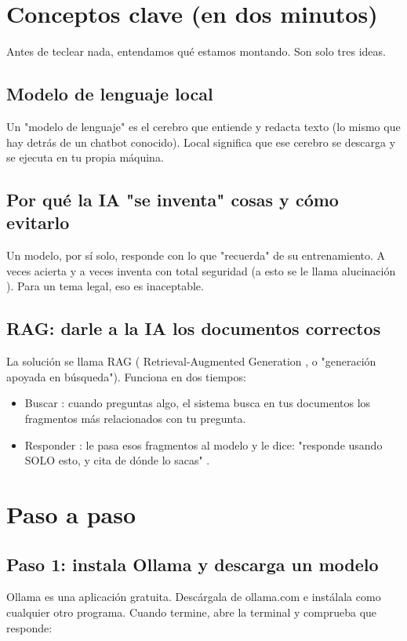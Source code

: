 \documentclass[11pt,a4paper]{book}
\begin{document}
\section{Conceptos clave (en dos minutos)}
Antes de teclear nada, entendamos qué estamos montando. Son solo tres ideas.

\subsection{Modelo de lenguaje local}
Un "modelo de lenguaje" es el cerebro que entiende y redacta texto (lo mismo que hay detrás de un chatbot conocido). Local significa que ese cerebro se descarga y se ejecuta en tu propia máquina.

\subsection{Por qué la IA "se inventa" cosas y cómo evitarlo}
Un modelo, por sí solo, responde con lo que "recuerda" de su entrenamiento. A veces acierta y a veces inventa con total seguridad (a esto se le llama alucinación ). Para un tema legal, eso es inaceptable.

\subsection{RAG: darle a la IA los documentos correctos}
La solución se llama RAG ( Retrieval-Augmented Generation , o "generación apoyada en búsqueda"). Funciona en dos tiempos:

\begin{itemize}\item Buscar : cuando preguntas algo, el sistema busca en tus documentos los fragmentos más relacionados con tu pregunta.\end{itemize}
\begin{itemize}\item Responder : le pasa esos fragmentos al modelo y le dice: "responde usando SOLO esto, y cita de dónde lo sacas" .\end{itemize}
\section{Paso a paso}
\subsection{Paso 1: instala Ollama y descarga un modelo}
Ollama es una aplicación gratuita. Descárgala de ollama.com e instálala como cualquier otro programa. Cuando termine, abre la terminal y comprueba que responde:
\end{document}
